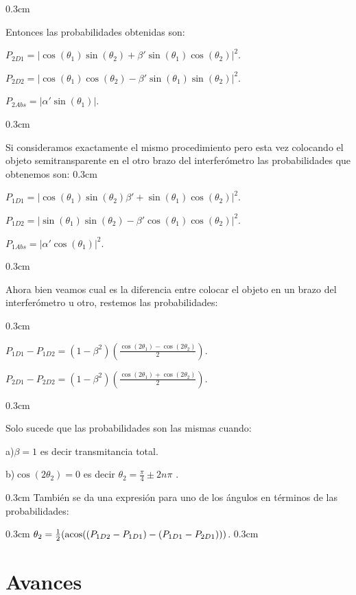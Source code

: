 \documentclass[11pt]{article}
\begin{document}
\vspace
{0.3cm}

Entonces las probabilidades obtenidas son:

$P_
{2D1}=|\cos
(\theta_
{1})\sin(\theta_
{2})+\beta' \sin(\theta_
{1})\cos
(\theta_
{2})|^2$.

$P_
{2D2}=|\cos
(\theta_
{1})\cos
(\theta_
{2})-\beta' \sin(\theta_
{1})\sin(\theta_
{2})|^2$.

$P_
{2Abs}=|\alpha
' \sin(\theta_
{1})|$.

\vspace
{0.3cm}

Si consideramos exactamente el mismo procedimiento pero esta vez colocando el objeto semitransparente en el otro brazo del interferómetro las probabilidades que obtenemos son:
\vspace
{0.3cm}

$P_
{1D1}=|\cos
(\theta_
{1})\sin(\theta_
{2})\beta' +\sin(\theta_
{1})\cos
(\theta_
{2})|^2$.

$P_
{1D2}=|\sin(\theta_
{1})\sin(\theta_
{2})-\beta' \cos
(\theta_
{1})\cos
(\theta_
{2})|^2$.

$P_
{1Abs}=|\alpha
' \cos
(\theta_
{1})|^2$.

\vspace
{0.3cm}

Ahora bien veamos cual es la diferencia entre colocar el objeto en un brazo del interferómetro u otro, restemos las probabilidades:

\vspace
{0.3cm}

$P_
{1D1}-P_
{1D2}=(1-\beta^2)\left(\frac{\cos
(2 \theta_
{1})-\cos
(2 \theta_
{2})}{2}\right)$.

$P_
{2D1}-P_
{2D2}=(1-\beta^2)\left(\frac{\cos
(2 \theta_
{1})+\cos
(2 \theta_
{2})}{2}\right)$.

\vspace
{0.3cm}

Solo sucede que las probabilidades son las mismas cuando:

a)$\beta=1  
$ es decir transmitancia total.

b)$\cos
(2 \theta_
{2})=0$   
es decir   
$\theta_
{2}=\frac{\pi}{4}\pm 2n\pi$
.

\vspace
{0.3cm}
También se da una expresión para uno de los ángulos en términos de las probabilidades:

\vspace
{0.3cm}
$\theta_
{2}=\frac{1}{2}(\acos((P_
{1D2}-P_
{1D1})-(P_
{1D1}-P_
{2D1})))$.
\vspace
{0.3cm}

\section
{Avances}
\end{document}
